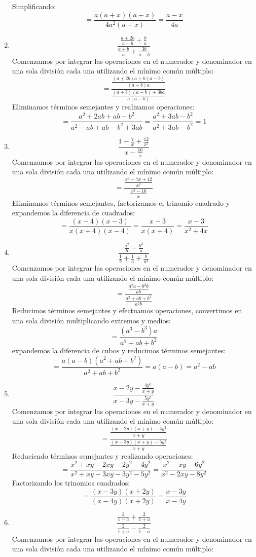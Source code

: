 \documentclass[12pt]{article}
\begin{document}
\begin{enumerate}[label=\bfseries Ejercicio \arabic*:]
Simplificando:
$$= \frac{a(a + x)(a - x)}{4a^2(a + x)} = \frac{a - x}{4a}$$
  \item $$\frac{\frac{a + 2b}{a - b}+ \frac{b}{a}}{\frac{a + b}{a} + \frac{3b}{a - b}}$$
Comenzamos por integrar las operaciones en el numerador y denominador en una sola división cada una utilizando el mínimo común múltiplo:
$$= \frac{\frac{(a + 2b)a + b(a - b)}{(a - b)a}}{\frac{(a + b)(a - b) + 3ba}{a(a - b)}}$$
Eliminamos términos semejantes y realizamos operaciones:
$$= \frac{a^2 + 2ab + ab - b^2}{a^2 -ab + ab - b^2 + 3ab} = \frac{a^2 + 3ab - b^2}{a^2 + 3ab - b^2} = 1$$
  \item $$\frac{1 - \frac{7}{x} + \frac{12}{x^2}}{x - \frac{16}{x}}$$
Comenzamos por integrar las operaciones en el numerador y denominador en una sola división cada una utilizando el mínimo común múltiplo:
$$= \frac{\frac{x^2 - 7x + 12}{x^2}}{\frac{x^2 - 16}{x}}$$
Eliminamos términos semejantes, factorizamos el trinomio cuadrado y expandemos la diferencia de cuadrados:
$$= \frac{(x - 4)(x - 3)}{x(x + 4)(x - 4)} = \frac{x - 3}{x(x + 4)} = \frac{x - 3}{x^2 + 4x}$$
  \item $$\frac{\frac{a^2}{b} - \frac{b^2}{a}}{\frac{1}{b} + \frac{1}{a} + \frac{b}{a^2}}$$
Comenzamos por integrar las operaciones en el numerador y denominador en una sola división cada una utilizando el mínimo común múltiplo:
$$= \frac{\frac{a^2a - b^2b}{ab}}{\frac{a^2 + ab + b^2}{a^2b}}$$
Reducimos términos semejantes y efectuamos operaciones, convertimos en una sola división multiplicando extremos y medios:
$$= \frac{(a^3 - b^3)a}{a^2 + ab + b^2}$$
expandemos la diferencia de cubos y reducimos términos semejantes:
$$= \frac{a(a - b)(a^2 + ab + b^2)}{a^2 + ab + b^2} = a(a - b) = a^2 - ab$$
  \item $$\frac{x - 2y - \frac{4y^2}{x + y}}{x - 3y - \frac{5y^2}{x + y}}$$
Comenzamos por integrar las operaciones en el numerador y denominador en una sola división cada una utilizando el mínimo común múltiplo:
$$= \frac{\frac{(x - 2y)(x + y) - 4y^2}{x + y}}{\frac{(x - 3y)(x + y) - 5y^2}{x + y}}$$
Reduciendo términos semejantes y realizando operaciones:
$$= \frac{x^2 + xy - 2xy - 2y^2 -4y^2}{x^2 + xy - 3xy - 3y^2 - 5y^2} = \frac{x^2 - xy - 6y^2}{x^2 - 2xy -8y^2}$$
Factorizando los trinomios cuadrados:
$$= \frac{(x - 3y)(x + 2y)}{(x - 4y)(x + 2y)} = \frac{x - 3y}{x - 4y}$$
  \item $$\frac{\frac{2}{1 - a} + \frac{2}{1 + a}}{\frac{2}{1 + a} - \frac{2}{1 - a}}$$
Comenzamos por integrar las operaciones en el numerador y denominador en una sola división cada una utilizando el mínimo común múltiplo:

\end{enumerate}
\end{document}
